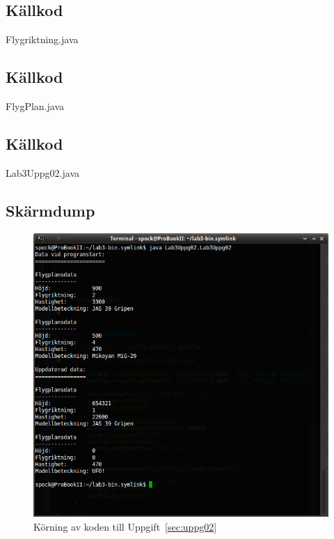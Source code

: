 \subsection{Källkod}
\caption{Flygriktning.java}
\label{src:flygriktning}

\subsection{Källkod}
\caption{FlygPlan.java}
\label{src:flygplan}

\subsection{Källkod}
\caption{Lab3Uppg02.java}
\label{src:uppg02}


\subsection{Skärmdump}
\begin{figure}[htbp]
    \centering
        \includegraphics[width=\linewidth]{img/02.png}
    \caption{Körning av koden till Uppgift~\ref{sec:uppg02}}
    \label{fig:uppg02-screenshot}
\end{figure}

